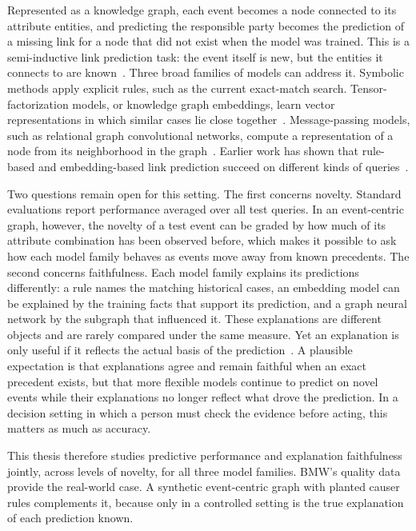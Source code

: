 Represented as a knowledge graph, each event becomes a node connected to its
attribute entities, and predicting the responsible party becomes the
prediction of a missing link for a node that did not exist when the model
was trained. This is a semi-inductive link prediction task: the event itself
is new, but the entities it connects to are
known~\cite{ali2021hyperrelational}. Three broad families of models can
address it. Symbolic methods apply explicit rules, such as the current
exact-match search. Tensor-factorization models, or knowledge graph
embeddings, learn vector representations in which similar cases lie close
together~\cite{bordes2013transe, trouillon2016complex}. Message-passing
models, such as relational graph convolutional networks, compute a
representation of a node from its neighborhood in the
graph~\cite{schlichtkrull2018rgcn}. Earlier work has shown that rule-based
and embedding-based link prediction succeed on different kinds of
queries~\cite{meilicke2018finegrained}.

Two questions remain open for this setting. The first concerns novelty.
Standard evaluations report performance averaged over all test queries. In
an event-centric graph, however, the novelty of a test event can be graded
by how much of its attribute combination has been observed before, which
makes it possible to ask how each model family behaves as events move away
from known precedents. The second concerns faithfulness. Each model family
explains its predictions differently: a rule names the matching historical
cases, an embedding model can be explained by the training facts that
support its prediction, and a graph neural network by the subgraph that
influenced it. These explanations are different objects and are rarely
compared under the same measure. Yet an explanation is only useful if it
reflects the actual basis of the prediction~\cite{jacovi2020faithfulness}. A
plausible expectation is that explanations agree and remain faithful when an
exact precedent exists, but that more flexible models continue to predict on
novel events while their explanations no longer reflect what drove the
prediction. In a decision setting in which a person must check the evidence
before acting, this matters as much as accuracy.

This thesis therefore studies predictive performance and explanation
faithfulness jointly, across levels of novelty, for all three model
families. BMW's quality data provide the real-world case.
A synthetic event-centric graph with planted causer rules complements it,
because only in a controlled setting is the true explanation of each
prediction known.
